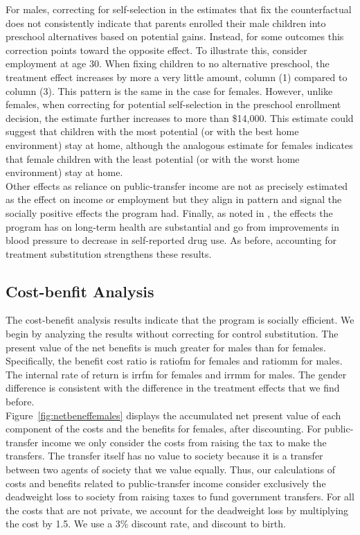 \noindent For males, correcting for self-selection in the estimates that fix the counterfactual does not consistently indicate that parents enrolled their male children into preschool alternatives based on potential gains. Instead, for some outcomes this correction points toward the opposite effect. To illustrate this, consider employment at age 30. When fixing children to no alternative preschool, the treatment effect increases by more a very little amount, column (1) compared to column (3). This pattern is the same in the case for females. However, unlike females, when correcting for potential self-selection in the preschool enrollment decision, the estimate further increases to more than \$14,000. This estimate could suggest that children with the most potential (or with the best home environment) stay at home, although the analogous estimate for females indicates that female children with the least potential (or with the worst home environment) stay at home.\\

\noindent Other effects as reliance on public-transfer income are not as precisely estimated as the effect on income or employment but they align in pattern and signal the socially positive effects the program had. Finally, as noted in \citet{Campbell_Conti_etal_2014_EarlyChildhoodInvestments}, the effects the program has on long-term health are substantial and go from improvements in blood pressure to decrease in self-reported drug use. As before, accounting for treatment substitution strengthens these results.\\

\subsection{Cost-benfit Analysis} \label{section:cbaresults}

\noindent The cost-benefit analysis results indicate that the program is socially efficient. We begin by analyzing the results without correcting for control substitution. The present value of the net benefits is much greater for males than for females. Specifically, the benefit cost ratio is ratiofm for females and ratiomm for males. The internal rate of return is irrfm for females and irrmm for males. The gender difference is consistent with the difference in the treatment effects that we find before.\\

\noindent Figure~\ref{fig:netbeneffemales} displays the accumulated net present value of each component of the costs and the benefits for females, after discounting. For public-transfer income we only consider the costs from raising the tax to make the transfers. The transfer itself has no value to society because it is a transfer between two agents of society that we value equally.  Thus, our calculations of costs and benefits related to public-transfer income consider exclusively the deadweight loss to society from raising taxes to fund government transfers. For all the costs that are not private, we account for the deadweight loss by multiplying the cost by 1.5. We use a 3\% discount rate, and discount to birth. \\

